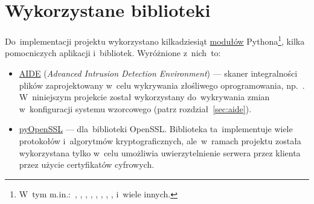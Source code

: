 \documentclass[thesis]{subfiles}
\begin{document}

\section{Wykorzystane biblioteki}
\label{sec:wykorzystane-oprogramowanie}

Do~implementacji projektu wykorzystano kilkadziesiąt \href{https://docs.python.org/dev/tutorial/modules.html}{modułów} Pythona\footnote{W~tym m.in.:~, , , , , , , ,  i~wiele innych.}, kilka pomocniczych aplikacji i~bibliotek. Wyróżnione z~nich~to:\mynobreakpar
\begin{itemize}
	\item \href{http://aide.sourceforge.net/}{AIDE} (\emph{Advanced Intrusion Detection Environment}) --- skaner integralności plików zaprojektowany w~celu wykrywania złośliwego oprogramowania, np.~. W~niniejszym projekcie został wykorzystany do~wykrywania zmian w~konfiguracji systemu wzorcowego (patrz rozdział~\ref{sec:aide}).
	\item \href{http://www.pyopenssl.org/}{pyOpenSSL} ---  dla~biblioteki OpenSSL. Biblioteka ta~implementuje wiele protokołów i~algorytmów kryptograficznych, ale~w~ramach projektu została wykorzystana tylko w~celu umożliwia uwierzytelnienie serwera przez klienta przez użycie certyfikatów cyfrowych.
\end{itemize}
\end{document}
